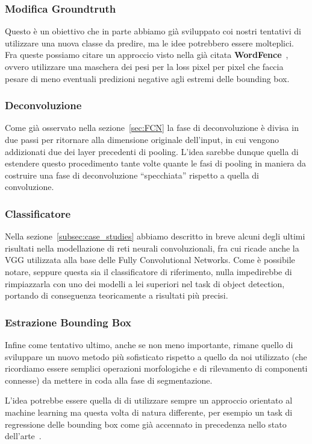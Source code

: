 \subsubsection{Modifica Groundtruth}
Questo è un obiettivo che in parte abbiamo già sviluppato coi nostri tentativi di utilizzare una nuova classe da predire, ma le idee potrebbero essere molteplici. Fra queste possiamo citare un approccio visto nella già citata \textbf{WordFence}~\cite{polzounov2017wordfence}, ovvero utilizzare una maschera dei pesi per la loss pixel per pixel che faccia pesare di meno eventuali predizioni negative agli estremi delle bounding box. 

\subsubsection{Deconvoluzione}
Come già osservato nella sezione~\ref{sec:FCN} la fase di deconvoluzione è divisa in due passi per ritornare alla dimensione originale dell'input, in cui vengono addizionati due dei layer precedenti di pooling. L'idea sarebbe dunque quella di estendere questo procedimento tante volte quante le fasi di pooling in maniera da costruire una fase di deconvoluzione ``specchiata'' rispetto a quella di convoluzione.\par

\subsubsection{Classificatore}
Nella sezione~\ref{subsec:case_studies} abbiamo descritto in breve alcuni degli ultimi risultati nella modellazione di reti neurali convoluzionali, fra cui ricade anche la VGG utilizzata alla base delle Fully Convolutional Networks. Come è possibile notare, seppure questa sia il classificatore di riferimento, nulla impedirebbe di rimpiazzarla con uno dei modelli a lei superiori nel task di object detection, portando di conseguenza teoricamente a risultati più precisi. 

\subsubsection{Estrazione Bounding Box}
Infine come tentativo ultimo, anche se non meno importante, rimane quello di sviluppare un nuovo metodo più sofisticato rispetto a quello da noi utilizzato (che ricordiamo essere semplici operazioni morfologiche e di rilevamento di componenti connesse) da mettere in coda alla fase di segmentazione.\par
L'idea potrebbe essere quella di di utilizzare sempre un approccio orientato al machine learning ma questa volta di natura differente, per esempio un task di regressione delle bounding box come già accennato in precedenza nello stato dell'arte~\cite{he2017deep}.

